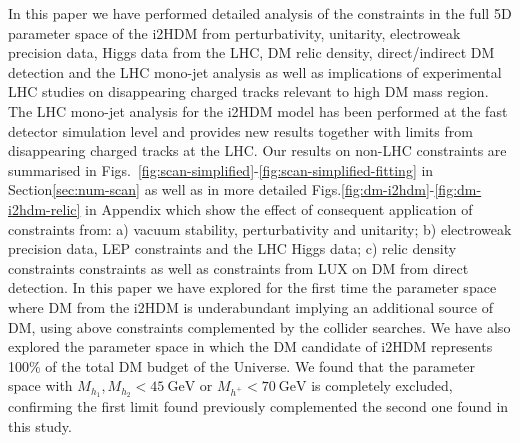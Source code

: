 \documentclass[12pt,a4paper]{article}
\begin{document}
In this paper we have performed 
detailed analysis of the   constraints in the full 5D  parameter space of the i2HDM from perturbativity, unitarity,
electroweak precision data, Higgs data from the LHC,
DM relic density, direct/indirect DM detection and the LHC mono-jet analysis as well as 
implications of experimental LHC studies on disappearing
charged tracks relevant to high DM mass region.
The LHC mono-jet analysis for the i2HDM model has been performed at the fast detector simulation level
and provides new results together with limits from disappearing
charged tracks at the LHC.
{Our results on non-LHC constraints are summarised in Figs.~\ref{fig:scan-simplified}-\ref{fig:scan-simplified-fitting} in Section\ref{sec:num-scan}
as well as in more detailed Figs.\ref{fig:dm-i2hdm}-\ref{fig:dm-i2hdm-relic}
in Appendix}
which show the effect of consequent application of constraints
from:  a) vacuum stability, perturbativity and unitarity;
b) electroweak precision data, LEP constraints and the LHC Higgs data;
c) relic density constraints constraints as well as constraints from LUX on DM from direct detection.
In this paper we have explored for the first time 
the parameter space where 
DM from the i2HDM is underabundant implying an additional source of DM,
using above constraints complemented by the  collider searches.
We have also explored  the parameter space in which the DM candidate of i2HDM represents 
100\% of the total DM budget of the Universe.
We found that the parameter space with  
$M_{h_1},M_{h_2}<45~\mbox{GeV} 
\mbox{\ or\ } M_{h^+}<70~\mbox{GeV}$
is completely excluded, confirming the first limit found previously
complemented the second one found in this study.
\end{document}

